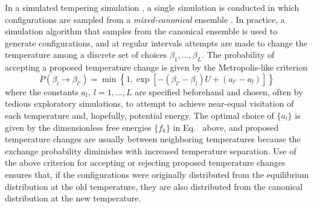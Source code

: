 In a simulated tempering simulation \cite{marinari:1992a,mitsutake:2000a}, a single simulation is conducted in which configurations are sampled from a \emph{mixed-canonical} ensemble \cite{fischer:1998a}.  In practice, a simulation algorithm that samples from the canonical ensemble is used to generate configurations, and at regular intervals attempts are made to change the temperature among a discrete set of choices $\beta_1, \ldots, \beta_L$.  The probability of accepting a proposed temperature change is given by the Metropolis-like criterion
\begin{equation}
P(\beta_l \rightarrow \beta_{l'}) = \min\left\{ 1, \exp[- (\beta_{l'} - \beta_l) U + (a_{l'} - a_l)] \right\}
\end{equation}
where the constants $a_l, \: l = 1,\ldots,L$ are specified beforehand and chosen, often by tedious exploratory simulations, to attempt to achieve near-equal visitation of each temperature and, hopefully, potential energy.  The optimal choice of $\{ a_l \}$ is given by the dimensionless free energies $\{ f_k \}$ in Eq.\ \label{wham:dimensionless-free-energy} above, and proposed temperature changes are usually between neighboring temperatures because the exchange probability diminishes with increased temperature separation.  Use of the above criterion for accepting or rejecting proposed temperature changes ensures that, if the configurations were originally distributed from the equilibrium distribution at the old temperature, they are also distributed from the canonical distribution at the new temperature.

